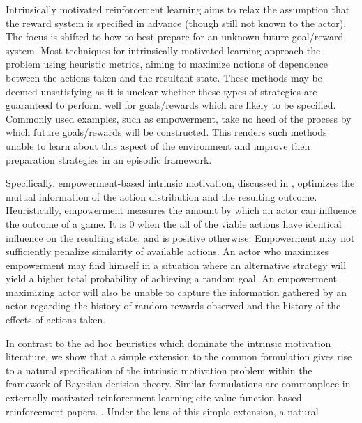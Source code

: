 \documentclass{article}
\begin{document}
Intrinsically motivated reinforcement learning aims to relax the assumption that the reward system is specified in advance (though still not known to the actor). The focus is shifted to how to best prepare for an unknown future goal/reward system. Most techniques for intrinsically motivated learning approach the problem using heuristic metrics, aiming to maximize notions of dependence between the actions taken and the resultant state. These methods may be deemed unsatisfying as it is unclear whether these types of strategies are guaranteed to perform well for goals/rewards which are likely to be specified. Commonly used examples, such as empowerment, take no heed of the process by which future goals/rewards will be constructed. This renders such methods unable to learn about this aspect of the environment and improve their preparation strategies in an episodic framework.    

Specifically, empowerment-based intrinsic motivation, discussed in \citep{mohamed2015variational}, optimizes the mutual information of the action distribution and the resulting outcome. Heuristically, empowerment measures the amount by which an actor can influence the outcome of a game. It is $0$ when the all of the viable actions have identical influence on the resulting state, and is positive otherwise. Empowerment may not sufficiently penalize similarity of available actions. An actor who maximizes empowerment may find himself in a situation where an alternative strategy will yield a higher total probability of achieving a random goal. An empowerment maximizing actor will also be unable to capture the information gathered by an actor regarding the history of random rewards observed and the history of the effects of actions taken. 

In contrast to the ad hoc heuristics which dominate the intrinsic motivation literature, we show that a simple extension to the common formulation gives rise to a natural specification of the intrinsic motivation problem within the framework of Bayesian decision theory. Similar formulations are commonplace in externally motivated reinforcement learning \color{red}cite value function based reinforcement papers. \color{black}. Under the lens of this simple extension, a natural 
\end{document}
